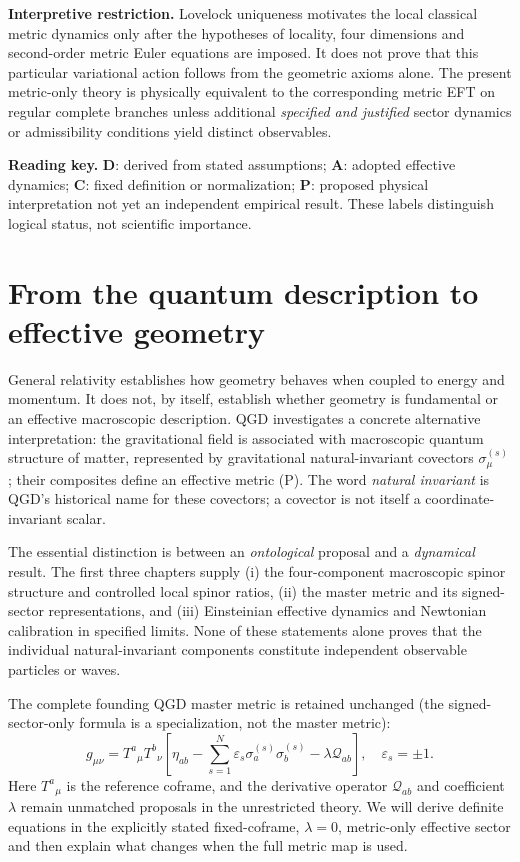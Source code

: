 \documentclass[11pt,a4paper]{article}
\begin{document}
\noindent\textbf{Interpretive restriction.} Lovelock uniqueness motivates the local classical metric dynamics only after the hypotheses of locality, four dimensions and second-order metric Euler equations are imposed. It does not prove that this particular variational action follows from the geometric axioms alone. The present metric-only theory is physically equivalent to the corresponding metric EFT on regular complete branches unless additional \emph{specified and justified} sector dynamics or admissibility conditions yield distinct observables.


\noindent\textbf{Reading key.} \textbf{D}: derived from stated assumptions;
\textbf{A}: adopted effective dynamics; \textbf{C}: fixed definition or
normalization; \textbf{P}: proposed physical interpretation not yet an
independent empirical result. These labels distinguish logical status,
not scientific importance.

\section{From the quantum description to effective geometry}
\label{sec:motivation}
General relativity establishes how geometry behaves when coupled to
energy and momentum. It does not, by itself, establish whether geometry
is fundamental or an effective macroscopic description. QGD investigates
a concrete alternative interpretation: the gravitational field is
associated with macroscopic quantum structure of matter, represented by
gravitational natural-invariant covectors $\sigma_\mu^{(s)}$; their
composites define an effective metric (P). The word \emph{natural
invariant} is QGD's historical name for these covectors; a covector is
not itself a coordinate-invariant scalar.

The essential distinction is between an \emph{ontological} proposal and a
\emph{dynamical} result. The first three chapters supply (i) the
four-component macroscopic spinor structure and controlled local spinor
ratios, (ii) the master metric and its signed-sector representations,
and (iii) Einsteinian effective dynamics and Newtonian calibration in
specified limits. None of these statements alone proves that the
individual natural-invariant components constitute independent
observable particles or waves.

The complete founding QGD master metric is retained unchanged (the signed-sector-only formula is a specialization, not the master metric):
\begin{equation}\label{eq:master}
\boxed{g_{\mu\nu}=T^a{}_{\mu}T^b{}_{\nu}
\left[\eta_{ab}-\sum_{s=1}^{N}\varepsilon_s
\sigma_a^{(s)}\sigma_b^{(s)}-\lambda\mathcal Q_{ab}\right],
\quad \varepsilon_s=\pm1.}
\end{equation}
Here $T^a{}_{\mu}$ is the reference coframe, and the derivative
operator $\mathcal Q_{ab}$ and coefficient $\lambda$ remain
unmatched proposals in the unrestricted theory. We will derive definite
equations in the explicitly stated fixed-coframe, $\lambda=0$,
metric-only effective sector and then explain what changes when the
full metric map is used.
\end{document}
